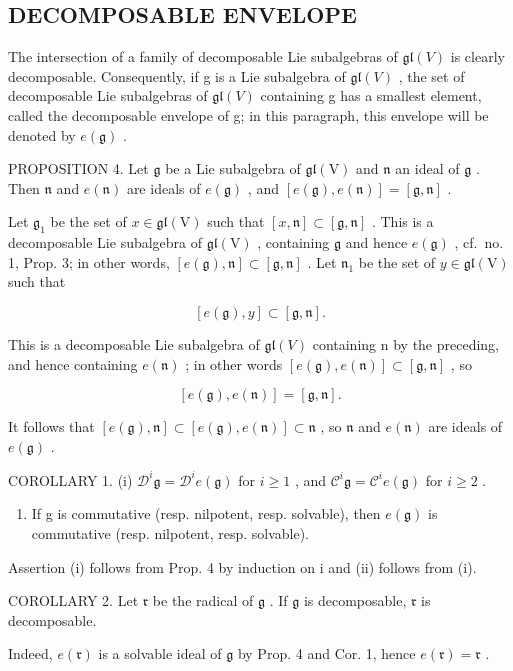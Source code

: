 \subsection{DECOMPOSABLE ENVELOPE}

The intersection of a family of decomposable Lie subalgebras of \(\mathfrak{gl}(V)\) is clearly decomposable. Consequently, if g is a Lie subalgebra of \(\mathfrak{gl}(V)\) , the set of decomposable Lie subalgebras of \(\mathfrak{gl}(V)\) containing g has a smallest element, called the decomposable envelope of g; in this paragraph, this envelope will be denoted by \(e(\mathfrak{g})\) .

PROPOSITION 4. Let \(\mathfrak{g}\) be a Lie subalgebra of \(\mathfrak{gl}(\mathrm{V})\) and \(\mathfrak{n}\) an ideal of \(\mathfrak{g}\) . Then \(\mathfrak{n}\) and \(e(\mathfrak{n})\) are ideals of \(e(\mathfrak{g})\) , and \([e(\mathfrak{g}), e(\mathfrak{n})] = [\mathfrak{g}, \mathfrak{n}]\) .

Let \(\mathfrak{g}_1\) be the set of \(x\in \mathfrak{gl}(\mathrm{V})\) such that \([x,\mathfrak{n}]\subset [\mathfrak{g},\mathfrak{n}]\) . This is a decomposable Lie subalgebra of \(\mathfrak{gl}(\mathrm{V})\) , containing \(\mathfrak{g}\) and hence \(e(\mathfrak{g})\) , cf.~no. 1, Prop. 3; in other words, \([e(\mathfrak{g}),\mathfrak{n}]\subset [\mathfrak{g},\mathfrak{n}]\) . Let \(\mathfrak{n}_1\) be the set of \(y\in \mathfrak{gl}(\mathrm{V})\) such that

\[
[ e (\mathfrak {g}), y ] \subset [ \mathfrak {g}, \mathfrak {n} ].
\]

This is a decomposable Lie subalgebra of \(\mathfrak{gl}(V)\) containing n by the preceding, and hence containing \(e(\mathfrak{n})\) ; in other words \([e(\mathfrak{g}), e(\mathfrak{n})] \subset [\mathfrak{g}, \mathfrak{n}]\) , so

\[
[ e (\mathfrak {g}), e (\mathfrak {n}) ] = [ \mathfrak {g}, \mathfrak {n} ].
\]

It follows that \([e(\mathfrak{g}),\mathfrak{n}]\subset [e(\mathfrak{g}),e(\mathfrak{n})]\subset \mathfrak{n}\) , so \(\mathfrak{n}\) and \(e(\mathfrak{n})\) are ideals of \(e(\mathfrak{g})\) .

COROLLARY 1. (i) \(\mathcal{D}^i\mathfrak{g} = \mathcal{D}^i e(\mathfrak{g})\) for \(i\geq 1\) , and \(\mathcal{C}^i\mathfrak{g} = \mathcal{C}^i e(\mathfrak{g})\) for \(i\geq 2\) .

\begin{enumerate}
\def\labelenumi{(\roman{enumi})}
\setcounter{enumi}{1}
\tightlist
\item
  If g is commutative (resp. nilpotent, resp. solvable), then \(e(\mathfrak{g})\) is commutative (resp. nilpotent, resp. solvable).
\end{enumerate}

Assertion (i) follows from Prop. 4 by induction on i and (ii) follows from (i).

COROLLARY 2. Let \(\mathfrak{r}\) be the radical of \(\mathfrak{g}\) . If \(\mathfrak{g}\) is decomposable, \(\mathfrak{r}\) is decomposable.

Indeed, \(e(\mathfrak{r})\) is a solvable ideal of \(\mathfrak{g}\) by Prop. 4 and Cor. 1, hence \(e(\mathfrak{r}) = \mathfrak{r}\) .


